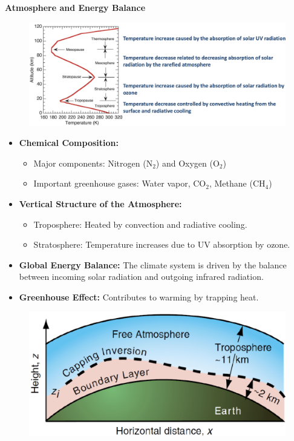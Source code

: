 \documentclass[fontsize=8pt, a4paper, landscape, fleqn]{scrartcl}
\renewcommand{\subsection}[1]{%
    \noindent\colorbox{subsectioncolor}{%
        \parbox{\dimexpr\columnwidth-2\fboxsep}{\color{white}\textbf{#1}}}%
    \vspace{0.5mm}%
}
\begin{document}
\begin{multicols*}{3}[\raggedcolumns]
\subsection{Atmosphere and Energy Balance}
\begin{figure}[H]
    \centering
    \includegraphics[width=\linewidth]{CS//img/Athmosphere.png}
\end{figure}
\begin{itemize}
    \item \textbf{Chemical Composition:}
    \begin{itemize}
        \item Major components: Nitrogen (N$_2$) and Oxygen (O$_2$)
        \item Important greenhouse gases: Water vapor, CO$_2$, Methane (CH$_4$)
    \end{itemize}
    \item \textbf{Vertical Structure of the Atmosphere:}
    \begin{itemize}
        \item Troposphere: Heated by convection and radiative cooling.
        \item Stratosphere: Temperature increases due to UV absorption by ozone.
    \end{itemize}
    \item \textbf{Global Energy Balance:} The climate system is driven by the balance between incoming solar radiation and outgoing infrared radiation.
    \item \textbf{Greenhouse Effect:} Contributes to warming by trapping heat.
\end{itemize}
\begin{figure}[H]
    \centering
    \includegraphics[width=0.5\linewidth]{CS//img/Planetary_layers.png}

\end{figure}
\end{multicols*}
\end{document}
